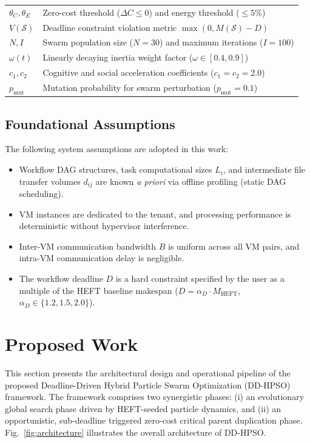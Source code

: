 \documentclass[journal]{IEEEtran}
\begin{document}
\begin{table}[t]
\begin{tabular}{ll}
$\theta_C, \theta_E$ & Zero-cost threshold ($\Delta C \le 0$) and energy threshold ($\le 5\%$) \\
$V(\mathcal{S})$ & Deadline constraint violation metric $\max(0, M(\mathcal{S}) - D)$ \\
$N, I$ & Swarm population size ($N=30$) and maximum iterations ($I=100$) \\
$\omega(t)$ & Linearly decaying inertia weight factor ($\omega \in [0.4, 0.9]$) \\
$c_1, c_2$ & Cognitive and social acceleration coefficients ($c_1 = c_2 = 2.0$) \\
$p_{\text{mut}}$ & Mutation probability for swarm perturbation ($p_{\text{mut}} = 0.1$) \\
\bottomrule
\end{tabular}
\end{table}

\subsection{Foundational Assumptions}
The following system assumptions are adopted in this work:
\begin{itemize}
    \item Workflow DAG structures, task computational sizes $L_i$, and intermediate file transfer volumes $d_{ij}$ are known \textit{a priori} via offline profiling (static DAG scheduling).
    \item VM instances are dedicated to the tenant, and processing performance is deterministic without hypervisor interference.
    \item Inter-VM communication bandwidth $B$ is uniform across all VM pairs, and intra-VM communication delay is negligible.
    \item The workflow deadline $D$ is a hard constraint specified by the user as a multiple of the HEFT baseline makespan ($D = \alpha_D \cdot M_{\text{HEFT}}$, $\alpha_D \in \{1.2, 1.5, 2.0\}$).
\end{itemize}

\section{Proposed Work}
This section presents the architectural design and operational pipeline of the proposed Deadline-Driven Hybrid Particle Swarm Optimization (DD-HPSO) framework. The framework comprises two synergistic phases: (i) an evolutionary global search phase driven by HEFT-seeded particle dynamics, and (ii) an opportunistic, sub-deadline triggered zero-cost critical parent duplication phase. Fig.~\ref{fig:architecture} illustrates the overall architecture of DD-HPSO.
\end{document}
